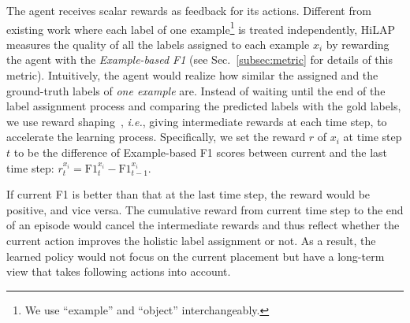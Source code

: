 \documentclass[11pt,a4paper]{article}
\newcommand{\start}[1]{\vspace{1.8mm}\noindent{{\bf #1}}}
\newcommand{\ie}{\textit{i.e.}} \newcommand{\eg}{\textit{e.g.}}
\begin{document}
\start{Rewards.}
The agent receives scalar rewards as feedback for its actions.
Different from existing work where each label of one example\footnote{We use ``example'' and ``object'' interchangeably.} is treated independently, HiLAP measures the quality of all the labels assigned to each example $x_i$ by rewarding the agent with the \textit{Example-based F1} (see Sec.~\ref{subsec:metric} for details of this metric).
Intuitively, the agent would realize how similar the assigned and the ground-truth labels of \textit{one example} are.
Instead of waiting until the end of the label assignment process and comparing the predicted labels with the gold labels, we use reward shaping~\citep{P18-1229}, \ie, giving intermediate rewards at each time step, to accelerate the learning process.
Specifically, we set the reward $r$ of $x_i$ at time step $t$ to be the difference of Example-based F1 scores between current and the last time step: $r_t^{x_i} = \text{F1}_{t}^{x_i} - \text{F1}_{t-1}^{x_i}$.

If current F1 is better than that at the last time step, the reward would be positive, and vice versa.
The cumulative reward from current time step to the end of an episode would cancel the intermediate rewards and thus reflect whether the current action improves the holistic label assignment or not.
As a result, the learned policy would not focus on the current placement but have a long-term view that takes following actions into account.
\end{document}
